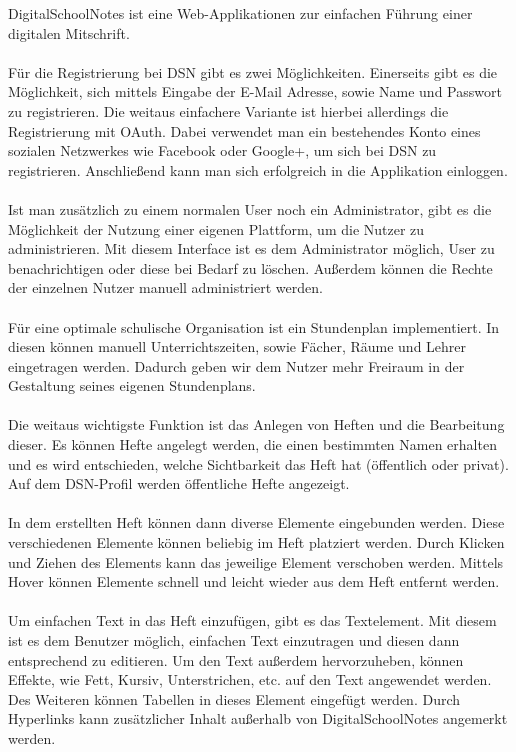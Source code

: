 DigitalSchoolNotes ist eine Web-Applikationen zur einfachen Führung einer digitalen Mitschrift.\\\\
Für die Registrierung bei DSN gibt es zwei Möglichkeiten. Einerseits gibt es die Möglichkeit, sich mittels Eingabe der E-Mail Adresse, sowie Name und Passwort zu registrieren. Die weitaus einfachere Variante ist hierbei allerdings die Registrierung mit OAuth. Dabei verwendet man ein bestehendes Konto eines sozialen Netzwerkes wie Facebook oder Google+, um sich bei DSN zu registrieren. Anschließend kann man sich erfolgreich in die Applikation einloggen.\\
\\
Ist man zusätzlich zu einem normalen User noch ein Administrator, gibt es die Möglichkeit der Nutzung einer eigenen Plattform, um die Nutzer zu administrieren. Mit diesem Interface ist es dem Administrator möglich, User zu benachrichtigen oder diese bei Bedarf zu löschen. Außerdem können die Rechte der einzelnen Nutzer manuell administriert werden.\\
\\
Für eine optimale schulische Organisation ist ein Stundenplan implementiert. In diesen können manuell Unterrichtszeiten, sowie Fächer, Räume und Lehrer eingetragen werden. Dadurch geben wir dem Nutzer mehr Freiraum in der Gestaltung seines eigenen Stundenplans.\\
\\
Die weitaus wichtigste Funktion ist das Anlegen von Heften und die Bearbeitung dieser. Es können Hefte angelegt werden, die einen bestimmten Namen erhalten und es wird entschieden, welche Sichtbarkeit das Heft hat (öffentlich oder privat). Auf dem DSN-Profil werden öffentliche Hefte angezeigt.\\
\\
In dem erstellten Heft können dann diverse Elemente eingebunden werden. Diese verschiedenen Elemente können beliebig im Heft platziert werden. Durch Klicken und Ziehen des Elements kann das jeweilige Element verschoben werden. Mittels Hover können Elemente schnell und leicht wieder aus dem Heft entfernt werden.\\
\\
Um einfachen Text in das Heft einzufügen, gibt es das Textelement. Mit diesem ist es dem Benutzer möglich, einfachen Text einzutragen und diesen dann entsprechend zu editieren. Um den Text außerdem hervorzuheben, können Effekte, wie Fett, Kursiv, Unterstrichen, etc. auf den Text angewendet werden. Des Weiteren können Tabellen in dieses Element eingefügt werden. Durch Hyperlinks kann zusätzlicher Inhalt außerhalb von DigitalSchoolNotes angemerkt werden.\\
